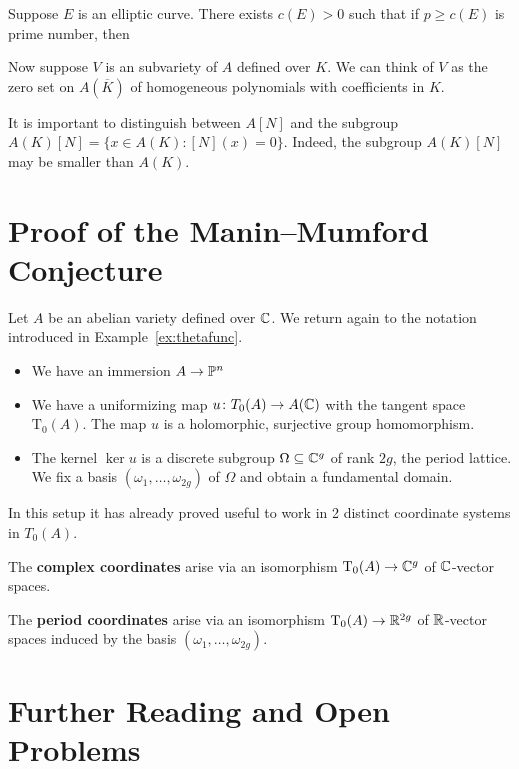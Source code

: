 \begin{theorem}[Serre]
  Suppose $E$ is an elliptic curve. There exists $c(E)>0$ such that
  if $p\ge c(E)$ is prime number, then 
\end{theorem}
Now suppose $V$ is an  subvariety of $A$ defined over $K$. We can
think of $V$ as the zero set on $A(\overline K)$ of homogeneous
polynomials with coefficients in $K$. 

It is important to distinguish between $A[N]$ and the subgroup
$A(K)[N] = \{x\in A(K) : [N](x)=0\}$. Indeed, the subgroup $A(K)[N]$ may be
smaller than $A(K)$.


\section{Proof of the Manin--Mumford Conjecture}

Let $A$ be an abelian variety defined over ${\mathbb{C}}$. We return again to
the notation introduced in Example~\ref{ex:thetafunc}.
\begin{itemize}
\item We have an immersion $A\rightarrow{\mathbb{P}}^n$
\item We have a uniformizing map $u\colon T_0(A)\rightarrow
  A({\mathbb{C}})$  with the tangent space
  $\mathrm{T}_0(A)$. The map $u$ is a holomorphic, surjective group
  homomorphism.
\item The kernel $\ker u$ is a discrete subgroup $\Omega\subseteq{\mathbb{C}}^g$
  of rank $2g$, the period lattice. We fix a basis $(\omega_1,\ldots,\omega_{2g})$ of
  $\Omega$ and obtain a fundamental domain.
\end{itemize}

In this setup it has already proved useful to work in 2 distinct
coordinate systems in $T_0(A)$.

\bigskip
\noindent The \textbf{complex coordinates} arise via an isomorphism
$\mathrm{T}_0(A)\rightarrow{\mathbb{C}}^g$ of ${\mathbb{C}}$-vector spaces. 

\bigskip
\noindent The \textbf{period coordinates} arise via an isomorphism
$\mathrm{T}_0(A)\rightarrow {\mathbb{R}}^{2g}$ of ${\mathbb{R}}$-vector spaces
induced by the basis $(\omega_1,\ldots,\omega_{2g})$. 


\section{Further Reading and Open Problems}



